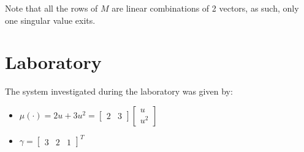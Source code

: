 Note that all the rows of $M$ are linear combinations of 2 vectors, as such, only one singular value exits.

\section{Laboratory}
The system investigated during the laboratory was given by:
\begin{itemize}
    \item $\mu(\cdot) = 2u+3u^{2} = \begin{bmatrix}
        2 &3  
    \end{bmatrix}  \begin{bmatrix}
        u \\u^{2}
    \end{bmatrix}$

\item $ \gamma = \begin{bmatrix}
        3 & 2 &1 
\end{bmatrix}^{T}$
\end{itemize}


